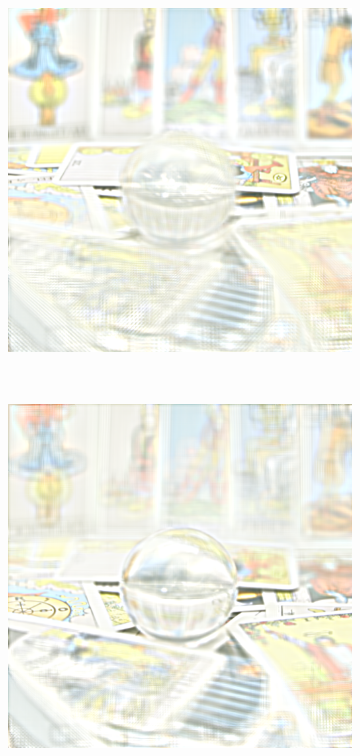 \documentclass[11pt,a4paper,titlepage]{article}
\begin{document}
\begin{figure}
\begin{subfigure}[t]{0.19\textwidth}
	\end{subfigure}%
	~
	\begin{subfigure}[t]{0.19\textwidth}
		\includegraphics[width=\textwidth]{results/tile_blending/tarot6x6x512x512-512x512x5-sampling=2x_tileRes=200x200_overlap=0.5/2.png} 
	\end{subfigure}%
	~
	\begin{subfigure}[t]{0.19\textwidth}
		\includegraphics[width=\textwidth]{results/tile_blending/tarot6x6x512x512-512x512x5-sampling=2x_tileRes=200x200_overlap=0.5/3.png} 

\end{subfigure}
\end{figure}
\end{document}
